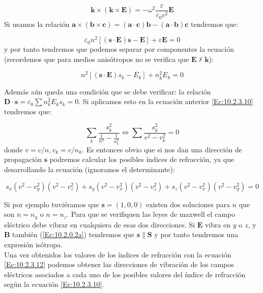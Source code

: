 \documentclass[12pt,a4paper]{article}
\newcommand{\Bn}{\mathbf{B}}
\newcommand{\En}{\mathbf{E}}
\newcommand{\Dn}{\mathbf{D}}
\newcommand{\kn}{\mathbf{k}}
\newcommand{\an}{\mathbf{a}}
\newcommand{\Sn}{\mathbf{S}}
\newcommand{\sn}{\mathbf{s}}
\newcommand{\bn}{\mathbf{b}}
\newcommand{\cn}{\mathbf{c}}
\numberwithin{equation}{section}
\numberwithin{figure}{section}
\begin{document}
\begin{equation}
\kn \times ( \kn \times \En ) = - \omega^2  \dfrac{\varepsilon}{\varepsilon_0 c^2} \En
\end{equation}
Si usamos la relación $\an \times (\bn \times \cn) = (\an \cdot \cn) \bn - (\an \cdot \bn) \cn$ tendremos que:

\begin{equation}
\varepsilon_0 n^2 [(\sn \cdot \En) \sn - \En] + \varepsilon \En = 0 
\end{equation}
y por tanto tendremos que podemos separar por componentes la ecuación (recordemos que para medios anisótropos no se verifica que $\En \nvdash \kn$):

\begin{equation}
n^2 [ (\sn \cdot \En) s_k - E_k ] + n_k^2 E_k = 0 \label{Ec:10.2.3.10}
\end{equation}

Además aún queda una condición que se debe verificar: la relación $\Dn \cdot \sn  = \varepsilon_0 \sum n_k^2 E_k s_k = 0$. Si aplicamos esto en la ecuación anterior \ref{Ec:10.2.3.10} tendremos que:

\begin{equation}
\sum_k \dfrac{s_k^2}{\frac{1}{n^2}-\frac{1}{n_k^2}} \Longleftrightarrow \sum \dfrac{s_k^2}{v^2 - v_k^2} = 0
\end{equation}
donde $v=c/n,v_k = c/n_k$. Es entonces obvio que si nos dan una dirección de propagación $\sn$ podremos calcular los posibles índices de refracción, ya que desarrollando la ecuación (ignoramos el determinante):

\begin{equation}
s_x (v^2 - v_y^2)(v^2-v_z^2)+s_y (v^2 - v_x^2)(v^2-v_z^2)+s_z (v^2 - v_x^2)(v^2-v_y^2)=0 \label{Ec:10.2.3.12}
\end{equation}

Si por ejemplo tuviéramos que $\sn=(1,0,0)$ existen dos soluciones para $n$ que son $n=n_y$ o $n=n_z$. Para que se verifiquen las leyes de maxwell el campo eléctrico debe vibrar en cualquiera de esas dos direcciones. Si $\En$ vibra en $y$ o $z$, y $\Bn$ también (\ref{Ec:10.2.0.2a}) tendremos que $\sn \parallel \Sn$ y por tanto tendremos una expresión isótropa. \\


Una vez obtenidos los valores de los índices de refracción con la ecuación \ref{Ec:10.2.3.12} podemos obtener las direcciones de vibración de los campos eléctricos asociados a cada uno de los posibles valores del índice de refracción según la ecuación \ref{Ec:10.2.3.10}.
\end{document}
